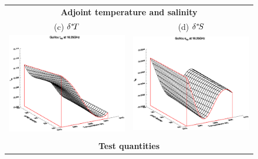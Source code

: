 \begin{figure}[htp]
\begin{tabular}{c c}
    \multicolumn{2}{c}{\sffamily\textbf{Adjoint temperature and salinity}}\\
    \textsf{(c)} $\delta^{*}\! {T}$ &
    \textsf{(d)} $\delta^{*}\! {S}$ \\
    \includegraphics[bb=130 240 508 540,clip,scale=0.5]{graphics/Guillou/TLAD/t_AD_16.25GHz.eps} &
    \includegraphics[bb=120 240 508 540,clip,scale=0.5]{graphics/Guillou/TLAD/s_AD_16.25GHz.eps} \\\\
    \multicolumn{2}{c}{\sffamily\textbf{Test quantities}}\\

\end{tabular}
\end{figure}
